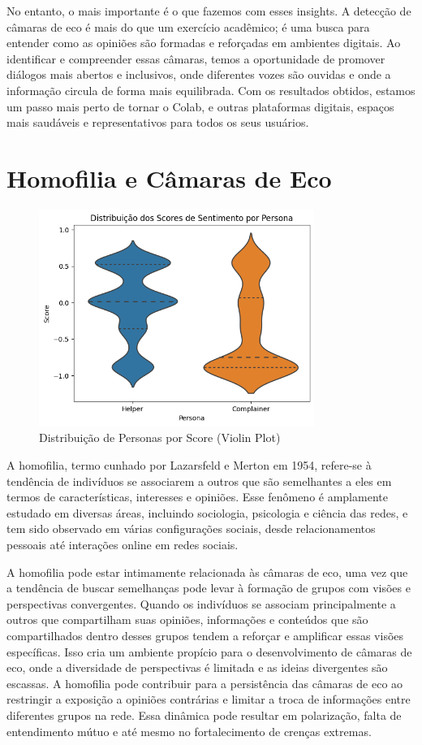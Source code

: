 No entanto, o mais importante é o que fazemos com esses insights. A detecção de câmaras de eco é mais do que um exercício acadêmico; é uma busca para entender como as opiniões são formadas e reforçadas em ambientes digitais. Ao identificar e compreender essas câmaras, temos a oportunidade de promover diálogos mais abertos e inclusivos, onde diferentes vozes são ouvidas e onde a informação circula de forma mais equilibrada. Com os resultados obtidos, estamos um passo mais perto de tornar o Colab, e outras plataformas digitais, espaços mais saudáveis e representativos para todos os seus usuários.

\section{Homofilia e Câmaras de Eco}

\begin{figure}[htb]
    \centering
    \includegraphics[width=0.8\textwidth]{images/personas_violin.png}
    \caption{Distribuição de Personas por Score (Violin Plot)}
    \label{fig:personas_violin}
\end{figure}

A homofilia, termo cunhado por Lazarsfeld e Merton em 1954, refere-se à tendência de indivíduos se associarem a outros que são semelhantes a eles em termos de características, interesses e opiniões. Esse fenômeno é amplamente estudado em diversas áreas, incluindo sociologia, psicologia e ciência das redes, e tem sido observado em várias configurações sociais, desde relacionamentos pessoais até interações online em redes sociais.

A homofilia pode estar intimamente relacionada às câmaras de eco, uma vez que a tendência de buscar semelhanças pode levar à formação de grupos com visões e perspectivas convergentes. Quando os indivíduos se associam principalmente a outros que compartilham suas opiniões, informações e conteúdos que são compartilhados dentro desses grupos tendem a reforçar e amplificar essas visões específicas. Isso cria um ambiente propício para o desenvolvimento de câmaras de eco, onde a diversidade de perspectivas é limitada e as ideias divergentes são escassas. A homofilia pode contribuir para a persistência das câmaras de eco ao restringir a exposição a opiniões contrárias e limitar a troca de informações entre diferentes grupos na rede. Essa dinâmica pode resultar em polarização, falta de entendimento mútuo e até mesmo no fortalecimento de crenças extremas.


